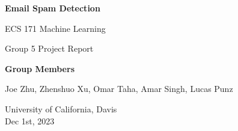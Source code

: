 \documentclass[10pt]{article}
\begin{document}
\begin{titlepage}
    \begin{center}
        \vspace*{1cm}
 
        \textbf{Email Spam Detection}
 
        \vspace{0.5cm}
        ECS 171 Machine Learning

        Group 5 Project Report
             
        \vspace{1.5cm}
 
        \textbf{Group Members}

        Joe Zhu, Zhenshuo Xu, Omar Taha, Amar Singh, Lucas Punz
 
        \vfill
             
        University of California, Davis\\
        Dec 1st, 2023
    \end{center}
\end{titlepage}
\end{document}
